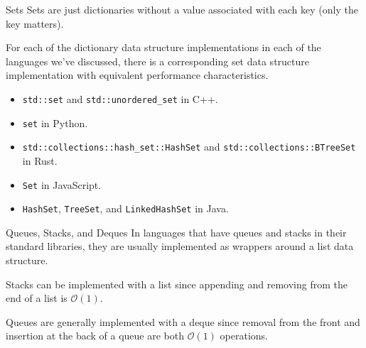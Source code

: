 \documentclass{algo}
\begin{document}
\begin{frame}{Sets}
    Sets are just dictionaries without a value associated with each key (only
    the key matters).

    For each of the dictionary data structure implementations in each of the
    languages we've discussed, there is a corresponding set data structure
    implementation with equivalent performance characteristics.
    \pause

    \begin{itemize}
        \item \texttt{std::set} and \texttt{std::unordered\_set} in C++.
        \item \texttt{set} in Python.
        \item \texttt{std::collections::hash\_set::HashSet} and
            \texttt{std::collections::BTreeSet} in Rust.
        \item \texttt{Set} in JavaScript.
        \item \texttt{HashSet}, \texttt{TreeSet}, and \texttt{LinkedHashSet} in
            Java.
    \end{itemize}
\end{frame}

\begin{frame}{Queues, Stacks, and Deques}
    In languages that have queues and stacks in their standard libraries, they
    are usually implemented as wrappers around a list data structure.
    \pause

    Stacks can be implemented with a list since appending and removing from the
    end of a list is $\mathcal{O}(1)$.
    \pause

    Queues are generally implemented with a deque since removal from the front
    and insertion at the back of a queue are both $\mathcal{O}(1)$ operations.
\end{frame}
\end{document}
